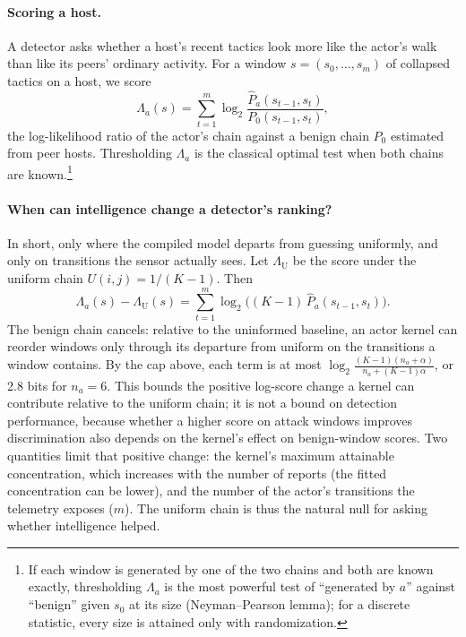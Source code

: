 \documentclass[letterpaper]{article}
\begin{document}
\paragraph{Scoring a host.} A detector asks whether a host's recent tactics look more like the actor's walk than like its peers' ordinary activity. For a window $s=(s_0,\ldots,s_m)$ of collapsed tactics on a host, we score
\begin{equation}
\Lambda_a(s)=\sum_{t=1}^{m}\log_2\frac{\hat P_a(s_{t-1},s_t)}{P_0(s_{t-1},s_t)},
\label{eq:lr}
\end{equation}
the log-likelihood ratio of the actor's chain against a benign chain $P_0$ estimated from peer hosts. Thresholding $\Lambda_a$ is the classical optimal test when both chains are known.\footnote{If each window is generated by one of the two chains and both are known exactly, thresholding $\Lambda_a$ is the most powerful test of ``generated by $a$'' against ``benign'' given $s_0$ at its size (Neyman--Pearson lemma); for a discrete statistic, every size is attained only with randomization.}

\paragraph{When can intelligence change a detector's ranking?} In short, only where the compiled model departs from guessing uniformly, and only on transitions the sensor actually sees. Let $\Lambda_{\mathrm{U}}$ be the score under the uniform chain $U(i,j)=1/(K-1)$. Then
\begin{equation}
\Lambda_a(s)-\Lambda_{\mathrm{U}}(s)=\sum_{t=1}^{m}\log_2\bigl((K-1)\,\hat P_a(s_{t-1},s_t)\bigr).
\label{eq:diff}
\end{equation}
The benign chain cancels: relative to the uninformed baseline, an actor kernel can reorder windows only through its departure from uniform on the transitions a window contains. By the cap above, each term is at most $\log_2\frac{(K-1)(n_a+\alpha)}{n_a+(K-1)\alpha}$, or 2.8 bits for $n_a=6$. This bounds the positive log-score change a kernel can contribute relative to the uniform chain; it is not a bound on detection performance, because whether a higher score on attack windows improves discrimination also depends on the kernel's effect on benign-window scores. Two quantities limit that positive change: the kernel's maximum attainable concentration, which increases with the number of reports (the fitted concentration can be lower), and the number of the actor's transitions the telemetry exposes ($m$). The uniform chain is thus the natural null for asking whether intelligence helped.
\end{document}
